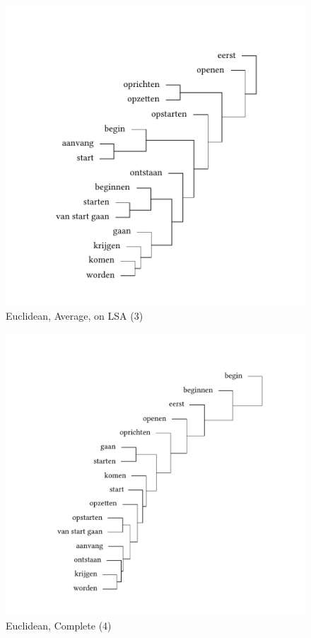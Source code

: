 \begin{figure}
\includegraphics[height=.4\textheight]{figures/tree32.pdf}
\caption{\label{fig:3:32}  Euclidean, Average, on LSA (3)}
\end{figure}

\begin{figure}
\includegraphics[height=.4\textheight]{figures/tree33.pdf}
\caption{\label{fig:3:33}  Euclidean, Complete (4)}
\end{figure}

